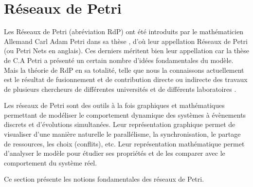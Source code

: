 \section{Réseaux de Petri}
Les Réseaux de Petri (abréviation  RdP) ont été introduits par le mathématicien Allemand Carl Adam Petri dans sa thèse \citep{Carl1962}, d'où leur appellation Réseaux de Petri (ou Petri Nets en anglais). Ces derniers méritent bien leur  appellation  car  la  thèse de C.A Petri a présenté un certain nombre d'idées fondamentales du modèle. Mais la théorie de RdP en sa totalité, telle que nous la connaissons actuellement est le résultat de fusionnement et de contribution directe ou indirecte des travaux de plusieurs  chercheurs de différentes universités et de différents laboratoires \citep{Robert2007}.

Les réseaux de Petri sont des outils à la fois graphiques et mathématiques permettant de modéliser le comportement dynamique des systèmes à  évènements discrets et d'évolutions simultanées. Leur représentation graphique permet de visualiser d'une manière naturelle le parallélisme, la synchronisation, le partage de ressources, les choix (conflits), etc. Leur représentation mathématique permet d'analyser le modèle pour étudier ses propriétés et de les comparer avec le comportement du système réel.

Ce section présente les notions fondamentales des réseaux de Petri.

